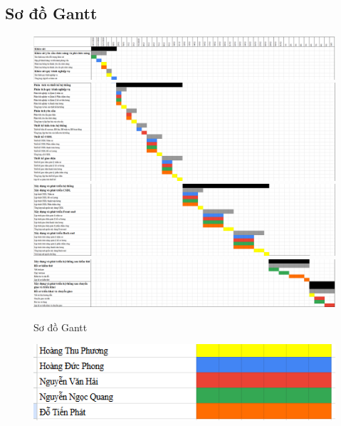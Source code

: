 \subsection{Sơ đồ Gantt}
\begin{figure}[H]
    \centering
    \includegraphics[width=\textwidth]{images/gantt1.png}
    \includegraphics[width=\textwidth]{images/gantt2.png}
    \includegraphics[width=\textwidth]{images/gantt3.png}
    \includegraphics[width=\textwidth]{images/gantt4.png}
    \caption{Sơ đồ Gantt}
\end{figure}
\begin{figure}[H]
    \centering
    \includegraphics[width=\textwidth]{images/gantt_tv.png}
\end{figure}
